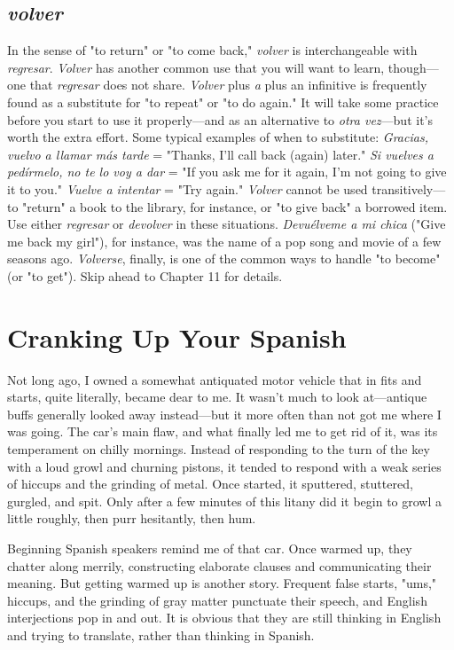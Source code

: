\documentclass[14pt,a4paper,oneside]{memoir}
\begin{document}
\section{\emph{volver}}

In the sense of "to return" or "to come back," \emph{volver} is interchangeable with \emph{regresar}. \emph{Volver} has another common use that you
will want to learn, though---one that \emph{regresar} does not share. \emph{Volver}
plus \emph{a} plus an infinitive is frequently found as a substitute for "to repeat" or "to do again." It will take some practice before you start to
use it properly---and as an alternative to \emph{otra vez}---but it's worth the
extra effort. Some typical examples of when to substitute: \emph{Gracias,
vuelvo a llamar más tarde} = "Thanks, I'll call back (again) later." \emph{Si
vuelves a pedírmelo, no te lo voy a dar} = "If you ask me for it again,
I'm not going to give it to you." \emph{Vuelve a intentar} = "Try again."
\emph{Volver} cannot be used transitively---to "return" a book to the library, for
instance, or "to give back" a borrowed item. Use either \emph{regresar} or \emph{devolver} in these situations. \emph{Devuélveme a mi chica} ("Give me back my
girl"), for instance, was the name of a pop song and movie of a few seasons ago. \emph{Volverse}, finally, is one of the common ways to handle "to
become" (or "to get"). Skip ahead to Chapter 11 for details.

\chapter{Cranking Up Your Spanish}

Not long ago, I owned a somewhat antiquated motor vehicle
that in fits and starts, quite literally, became dear to me. It wasn't
much to look at---antique buffs generally looked away instead---but
it more often than not got me where I was going. The car's main flaw,
and what finally led me to get rid of it, was its temperament on chilly
mornings. Instead of responding to the turn of the key with a loud
growl and churning pistons, it tended to respond with a weak series of
hiccups and the grinding of metal. Once started, it sputtered, stuttered,
gurgled, and spit. Only after a few minutes of this litany did it begin to
growl a little roughly, then purr hesitantly, then hum.

Beginning Spanish speakers remind me of that car. Once
warmed up, they chatter along merrily, constructing elaborate clauses
and communicating their meaning. But getting warmed up is another
story. Frequent false starts, "ums," hiccups, and the grinding of gray
matter punctuate their speech, and English interjections pop in and
out. It is obvious that they are still thinking in English and trying to
translate, rather than thinking in Spanish.
\end{document}
